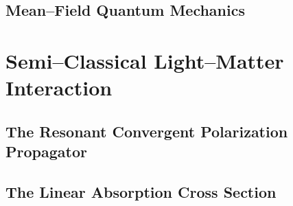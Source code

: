







\subsection{Mean--Field Quantum Mechanics}
\label{sec:MF}


\section{Semi--Classical Light--Matter Interaction}
\label{sec:SCLMI}

\subsection{The Resonant Convergent Polarization Propagator}
\label{sec:PolarProp}

\subsection{The Linear Absorption Cross Section}
\label{sec:AbsorptionTheory}
